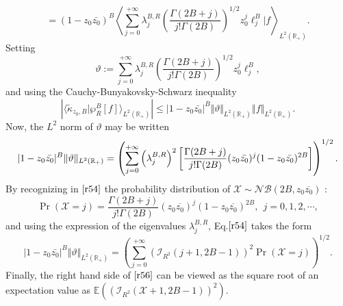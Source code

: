 \begin{equation}
\label{r52}
=(1-z_{0}\bar{z_{0}})^{B}\left\langle \sum_{j=0}^{+\infty }\lambda
_{j}^{B,R}\left( \frac{\Gamma (2B+j)}{j!\Gamma (2B)}\right)
^{1/2}z_{0}^{j}\ell _{j}^{B}|f\right\rangle _{L^{2}(\mathbb{R}_{+})}. 
\end{equation}
Setting 
\begin{equation}
\label{r53}
\vartheta :=\sum_{j=0}^{+\infty }\lambda _{j}^{B,R}\left( \frac{\Gamma (2B+j)%
}{j!\Gamma (2B)}\right) ^{1/2}z_{0}^{j}\ell _{j}^{B},  
\end{equation}
and using the Cauchy-Bunyakovsky-Schwarz inequality 
\begin{equation}
\label{r54}
\left\vert \langle \widetilde{\kappa }_{z_{0},B}|\wp _{R}^{B}[f]\rangle
_{L^{2}\left( \mathbb{R}_{+}\right) }\right\vert \leq |1-z_{0}\bar{z_{0}}%
|^{B}\Vert \vartheta \Vert _{L^{2}(\mathbb{R}_{+})}\left\Vert f\right\Vert
_{L^{2}\left( \mathbb{R}_{+}\right) }.
\end{equation}
Now, the $L^{2}$ norm of $\vartheta $ may be written 
\begin{equation}
\label{r54dpc}
|1-z_{0}\bar{z_{0}}|^{B}\Vert \vartheta \Vert _{L^{2}(\mathbb{R}%
_{+})}=\left( \sum_{j=0}^{+\infty }\left( \lambda _{j}^{B,R}\right) ^{2}%
\left[ \frac{\Gamma (2B+j)}{j!\Gamma (2B)}(z_{0}\bar{z_{0}})^{j}(1-z_{0}\bar{%
z_{0}})^{2B}\right] \right) ^{1/2}.
\end{equation}
By recognizing in $\eqref{r54} $ the probability distribution of $%
\mathcal{X}\sim \mathcal{N}\mathcal{B}(2B,z_{0}\overline{z_{0}})$ : 
\begin{equation}
\label{r55}
\Pr \left( \mathcal{X}=j\right) =\frac{\Gamma (2B+j)}{j!\Gamma (2B)}\left(
z_{0}\overline{z_{0}}\right) ^{j}(1-z_{0}\overline{z_{0}})^{2B},\ \
j=0,1,2,\cdots ,  
\end{equation}
and using the expression of the eigenvalues $\lambda _{j}^{B,R}$, Eq.$\eqref{r54} $ takes the form 
\begin{equation}
\label{r56}
|1-z_{0}\bar{z_{0}}|^{B}\Vert \vartheta \Vert _{L^{2}(\mathbb{R}%
_{+})}=\left( \sum_{j=0}^{+\infty }\left( \mathcal{I}_{R^{2}}(j+1,2B-1)%
\right) ^{2}\Pr \left( \mathcal{X}=j\right) \right) ^{1/2}. 
\end{equation}
Finally, the right hand side of $\eqref{r56} $  can be viewed as the
square root of an expectation value as $\mathbb{E}\left( \left( \mathcal{I}%
_{R^{2}}(\mathcal{X}+1,2B-1)\right) ^{2}\right) $.





















